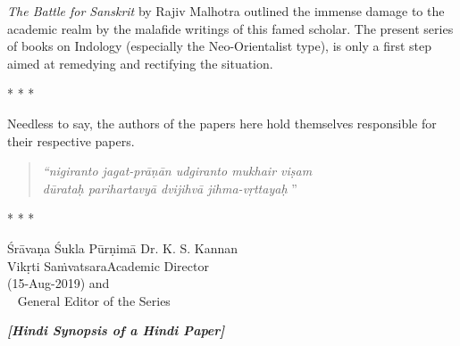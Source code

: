\textit{The Battle for Sanskrit} by Rajiv Malhotra outlined the immense damage to the academic realm by the malafide writings of this famed scholar. The present series of books on Indology (especially the Neo-Orientalist type), is only a first step aimed at remedying and rectifying the situation.

\begin{center}
* * *
\end{center}

Needless to say, the authors of the papers here hold themselves responsible for their respective papers.

\begin{verse}
\textit{“nigiranto jagat-prāṇān udgiranto mukhair viṣam}  \\\textit{dūrataḥ parihartavyā dvijihvā jihma-vṛttayaḥ} ”
\end{verse}

\vskip 3pt

\begin{center}
* * *
\end{center}

\vskip 30pt

\noindent
Śrāvaṇa Śukla Pūrṇimā \hfill Dr. K. S. Kannan\\
Vikṛti Saṁvatsara\hfill Academic Director\\
(15-Aug-2019) \hfill and\\
\phantom{a}~ \hfill General Editor of the Series

\newpage

\begin{center}
\textbf{\textit{[Hindi Synopsis of a Hindi Paper]}}
\end{center}

\bgroup

\selectdev

\section*{}



